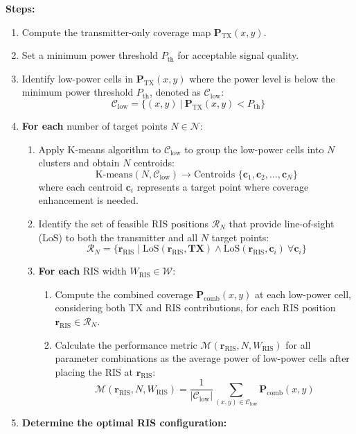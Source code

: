 \documentclass{article}
\begin{document}
\noindent \textbf{Steps:}
\begin{enumerate}
	\item Compute the transmitter-only coverage map $\mathbf{P}_{\text{TX}}(x, y)$.
	\item Set a minimum power threshold $P_{\text{th}}$ for acceptable signal quality.
	\item Identify low-power cells in $\mathbf{P}_{\text{TX}}(x, y)$ where the power level is below the minimum power threshold $P_{\text{th}}$, denoted as $\mathcal{C}_{\text{low}}$:
	\[
	\mathcal{C}_{\text{low}} = \{(x, y) \ | \ \mathbf{P}_{\text{TX}}(x, y) < P_{\text{th}}\}
	\]	
	\item \textbf{For each} number of target points $N \in \mathcal{N}$:
	\begin{enumerate}
		\item Apply K-means algorithm to $\mathcal{C}_{\text{low}}$ to group the low-power cells into $N$ clusters and obtain $N$ centroids:
		\[
		\text{K-means}(N, \mathcal{C}_{\text{low}}) \rightarrow \text{Centroids } \{ \mathbf{c}_1, \mathbf{c}_2, \dots, \mathbf{c}_N \}
		\]
		where each centroid $\mathbf{c}_i$ represents a target point where coverage enhancement is needed.
		\item Identify the set of feasible RIS positions $\mathcal{R}_N$ that provide line-of-sight (LoS) to both the transmitter and all $N$ target points:
		\[
		\mathcal{R}_N = \{ \mathbf{r}_{\text{RIS}} \mid \text{LoS}(\mathbf{r}_{\text{RIS}}, \mathbf{TX}) \land \text{LoS}(\mathbf{r}_{\text{RIS}}, \mathbf{c}_i) \ \forall \mathbf{c}_i \}
		\]
		\item \textbf{For each} RIS width $W_{\text{RIS}} \in \mathcal{W}$:
		\begin{enumerate}
			\item Compute the combined coverage $\textbf{P}_{\text{comb}}(x,y)$ at each low-power cell, considering both TX and RIS contributions, for each RIS position $\mathbf{r}_{\text{RIS}} \in \mathcal{R}_N$.
			\item Calculate the performance metric $\mathcal{M}(\mathbf{r}_{\text{RIS}}, N, W_{\text{RIS}})$ for all parameter combinations as the average power of low-power cells after placing the RIS at $\mathbf{r}_{\text{RIS}}$:
			\[
			\mathcal{M}(\mathbf{r}_{\text{RIS}}, N, W_{\text{RIS}}) = \frac{1}{|\mathcal{C}_{\text{low}}|} \sum_{(x, y) \in \mathcal{C}_{\text{low}}} \mathbf{P}_{\text{comb}}(x, y)
			\]
		\end{enumerate}
	\end{enumerate}
	\item \textbf{Determine the optimal RIS configuration:}

\end{enumerate}
\end{document}
